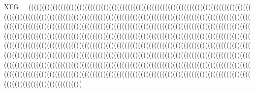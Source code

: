XFG                        ((( ((( ((( ((( ((( ((( ((( ((( ((( ((( ((( ((( ((( ((( ((( ((( ((( ((( ((( ((( ((( ((( ((( ((( ((( ((( ((( ((( ((( ((( ((( ((( ((( ((( ((( ((( ((( ((( ((( ((( ((( ((( ((( ((( ((( ((( ((( ((( ((( ((( ((( ((( ((( ((( ((( ((( ((( ((( ((( ((( ((( ((( ((( ((( ((( ((( ((( ((( ((( ((( ((( ((( ((( ((( ((( ((( ((( ((( ((( ((( ((( ((( ((( ((( ((( ((( ((( ((( ((( ((( ((( ((( ((( ((( ((( ((( ((( ((( ((( ((( ((( ((( ((( ((( ((( ((( ((( ((( ((( ((( ((( ((( ((( ((( ((( ((( ((( ((( ((( ((( ((( ((( ((( ((( ((( ((( ((( ((( ((( ((( ((( ((( ((( ((( ((( ((( ((( ((( ((( ((( ((( ((( ((( ((( ((( ((( ((( ((( ((( ((( ((( ((( ((( ((( ((( ((( ((( ((( ((( ((( ((( ((( ((( ((( ((( ((( ((( ((( ((( ((( ((( ((( ((( ((( ((( ((( ((( ((( ((( ((( ((( ((( ((( ((( ((( ((( ((( ((( ((( ((( ((( ((( ((( ((( ((( ((( ((( ((( ((( ((( ((( ((( ((( ((( ((( ((( ((( ((( ((( ((( ((( ((( ((( ((( ((( ((( ((( ((( ((( ((( ((( ((( ((( ((( ((( ((( ((( ((( ((( ((( ((( ((( ((( ((( ((( ((( ((( ((( ((( ((( ((( ((( ((( ((( ((( ((( ((( ((( ((( ((( ((( ((( 